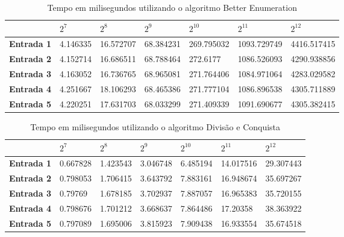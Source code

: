 \documentclass[
	12pt,				%
	oneside,   	        %
	a4paper,			%
	english,			%
	french,				%
	spanish,			%
	brazil,				%
	]{pacotes/abntex2}
\begin{document}
\begin{apendicesenv}
\begin{table}[!htb]
\centering
\caption{Tempo em milisegundos utilizando o algoritmo Better Enumeration}
\label{tab:java2}
\footnotesize   %
\begin{tabular}{l|llllll}
\toprule
& \textbf{$2^7$} & \textbf{$2^8$} & \textbf{$2^9$} & \textbf{$2^{10}$} & \textbf{$2^{11}$} & \textbf{$2^{12}$}\\ 
\midrule
\textbf{Entrada 1} & 4.146335 &	16.572707 &	68.384231 &	269.795032 &	1093.729749 &	4416.517415\\
\textbf{Entrada 2} & 4.152714 &	16.686511 &	68.788464 &	272.6177 &	1086.526093 &	4290.938856\\
\textbf{Entrada 3} & 4.163052 &	16.736765 &	68.965081 &	271.764406 &	1084.971064 &	4283.029582\\
\textbf{Entrada 4} & 4.251667 &	18.106293 &	68.465386 &	271.777104 &	1086.896538 & 4305.711889\\
\textbf{Entrada 5} & 4.220251 &	17.631703 &	68.033299 &	271.409339 &	1091.690677 & 4305.382415\\
 \bottomrule
\end{tabular}
\end{table}

\begin{table}[!htb]
\centering
\caption{Tempo em milisegundos utilizando o algoritmo Divisão e Conquista}
\label{tab:java3}
\footnotesize   %
\begin{tabular}{l|llllll}
\toprule
& \textbf{$2^7$} & \textbf{$2^8$} & \textbf{$2^9$} & \textbf{$2^{10}$} & \textbf{$2^{11}$} & \textbf{$2^{12}$}\\ 
\midrule
\textbf{Entrada 1} & 0.667828 &	1.423543 &	3.046748 &	6.485194 &	14.017516 &	29.307443\\
\textbf{Entrada 2} & 0.798053 &	1.706415 &	3.643792 &	7.883161 &	16.948674 &	35.697267\\
\textbf{Entrada 3} & 0.79769 &	1.678185 &	3.702937 &	7.887057 &	16.965383 &	35.720155\\
\textbf{Entrada 4} & 0.798676 &	1.701212 &	3.668637 &	7.864486 &	17.20358	 & 38.363922\\
\textbf{Entrada 5} & 0.797089 &	1.695006 &	3.815923 &	7.909438 &	16.933554 &	35.674518\\

 \bottomrule
\end{tabular}
\end{table}


\end{apendicesenv}
\end{document}
